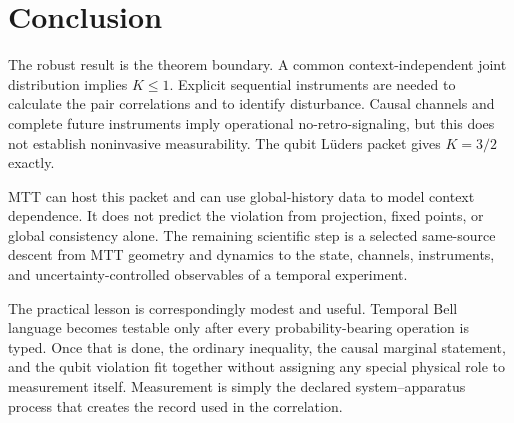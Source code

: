 \documentclass[11pt]{article}
\theoremstyle{definition}
\theoremstyle{remark}
\begin{document}
\section{Conclusion}

The robust result is the theorem boundary.  A common context-independent
joint distribution implies $K\leq1$.  Explicit sequential instruments are
needed to calculate the pair correlations and to identify disturbance.
Causal channels and complete future instruments imply operational
no-retro-signaling, but this does not establish noninvasive measurability.
The qubit L\"uders packet gives $K=3/2$ exactly.

MTT can host this packet and can use global-history data to model context
dependence.  It does not predict the violation from projection, fixed points,
or global consistency alone.  The remaining scientific step is a selected
same-source descent from MTT geometry and dynamics to the state, channels,
instruments, and uncertainty-controlled observables of a temporal experiment.

The practical lesson is correspondingly modest and useful.  Temporal Bell
language becomes testable only after every probability-bearing operation is
typed.  Once that is done, the ordinary inequality, the causal marginal
statement, and the qubit violation fit together without assigning any special
physical role to measurement itself.  Measurement is simply the declared
system--apparatus process that creates the record used in the correlation.
\end{document}
